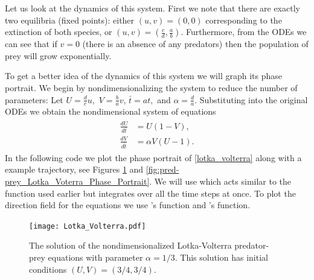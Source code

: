 Let us look at the dynamics of this system.
First we note that there are exactly two equilibria (fixed points): either $(u,v) = (0,0)$ corresponding to the extinction of both species, or $(u,v) = (\frac{c}{d},\frac{a}{b})$.
Furthermore, from the ODEs we can see that if $v=0$ (there is an absence of any predators) then the population of prey will grow exponentially.

To get a better idea of the dynamics of this system we will graph its phase portrait.
We begin by nondimensionalizing the system to reduce the number of parameters:
Let $U = \frac{d}{c}u,$ $V = \frac{b}{a}v$, $\bar{t} = at,$ and $\alpha = \frac{d}{a}$.
Substituting into the original ODEs we obtain the nondimensional system of equations
\begin{align}
	\begin{split}
	\frac{dU}{d\bar{t}} &= U(1-V),\\
	\frac{dV}{d\bar{t}} &= \alpha V (U-1).
	\end{split}\label{lotka_volterra}
\end{align}
In the following code we plot the phase portrait of \eqref{lotka_volterra} along with a example trajectory, see Figures  \ref{fig:pred-prey_Lotka_Voterra} and \ref{fig:pred-prey_Lotka_Voterra_Phase_Portrait}.
We will use  which acts similar to the  function used earlier but integrates over all the time steps at once.
To plot the direction field for the equations we use 's  function and 's  function.

\begin{figure}
\centering
\texttt{[image: Lotka\_Volterra.pdf]}
\caption{The solution of the nondimensionalized Lotka-Volterra predator-prey equations with parameter $\alpha = 1/3$.
This solution has initial conditions $(U,V) = (3/4, 3/4)$.}
\label{fig:pred-prey_Lotka_Voterra}
\end{figure}

